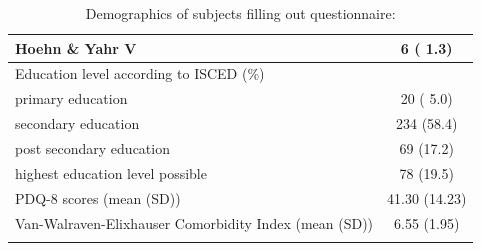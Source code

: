 \documentclass{bmcart}
\begin{document}
\begin{backmatter}
\begin{table}[!ht]
\begin{tabular}{p{5cm} c}
\hspace{3mm} Hoehn \& Yahr V  												&     	6 ( 1.3) 		\\ \hline
Education level according \newline to ISCED (\%) 									& 				\\ \hline
\hspace{3mm} primary education  												& 	20 ( 5.0) 		\\ \hline
\hspace{3mm} secondary education 						 					& 	234 (58.4)		\\ \hline
\hspace{3mm} post secondary education  										&   	69 (17.2) 		\\ \hline
\hspace{3mm} highest education level possible 										& 	78 (19.5)  		\\ \hline
\hspace{3mm} PDQ-8 scores (mean (SD)) 										& 	41.30 (14.23) 	\\ \hline
Van-Walraven-Elixhauser \newline \hspace{3mm} Comorbidity Index (mean (SD)) 	& 	6.55 (1.95) 		\\ 
\bottomrule
\caption{Demographics of subjects filling out questionnaire:}
\label{tab1:demographics}
\end{tabular}
\end{table}

		

		

\end{backmatter}
\end{document}
